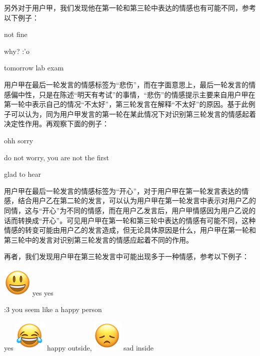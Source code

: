 另外对于用户甲，我们发现他在第一轮和第三轮中表达的情感也有可能不同，参考以下例子：

 not fine\par
{} why? :'o \par
{} tomorrow lab exam\par

用户甲在最后一轮发言的情感标签为“悲伤”，而在字面意思上，最后一轮发言的情感偏中性，只是在陈述“明天有考试”的事情，“悲伤”的情感提示主要来自用户甲在第一轮中表示自己的情况“不太好”，第三轮发言在解释“不太好”的原因。基于此例子可以认为，同为用户甲发言的第一轮在某此情况下对识别第三轮发言的情感起着决定性作用。再观察下面的例子：

 ohh sorry\par
{} do not worry, you are not the first \par
{} glad to hear\par

用户甲在最后一轮发言的情感标签为“开心”，对于用户甲在第一轮发言表达的情感，结合用户乙在第二轮的发言，可以认为用户甲在第一轮发言中表示对用户乙的同情，这与“开心”为不同的情感，而在用户乙发言后，用户甲情感因为用户乙说的话而转换成“开心”。可见用户甲在第一轮和第三轮中表达的情感有可能不同，这种情感的转变可能由用户乙的发言造成，但无论具体原因是什么，用户甲在第一轮和第三轮中的发言对识别第三轮发言的情感应起着不同的作用。

再者，我们发现用户甲在第三轮发言中可能出现多于一种情感，参考以下例子：

 \includegraphics[height=1.5\fontcharht\font`\B]{img/emoji/laugh.png} yes yes \par
{} :3 you seem like a happy person \par
{} yes \includegraphics[height=1.5\fontcharht\font`\B]{img/emoji/lol.png} happy outside, \includegraphics[height=1.5\fontcharht\font`\B]{img/emoji/frown.png} sad inside \par

